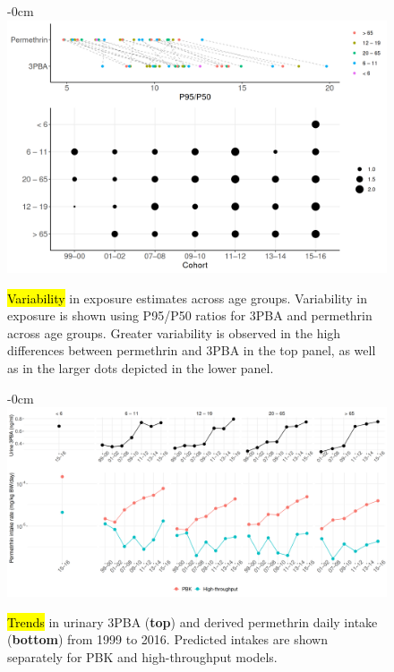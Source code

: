 \documentclass[toxics,article,accept,pdftex,moreauthors]{Definitions/mdpi}
\begin{document}
\begin{figure}[H]
\begin{adjustwidth}{-\extralength}{0cm}
~~~~~~~~~~~\includegraphics[width=0.9\linewidth,]{figures/fig5_variability} 
\end{adjustwidth}
\caption{\hl{Variability} %
 in exposure estimates across age groups. 
Variability in exposure is shown using P95/P50 ratios for 3PBA and permethrin across age groups. 
Greater variability is observed in the high differences between permethrin and 3PBA in the top panel, 
as well as in the larger dots depicted in the lower panel.}\label{fig:fig5}
\end{figure}

\vspace{-10pt}

\begin{figure}[H]
\begin{adjustwidth}{-\extralength}{0cm}
~~~~~~~~~~~\includegraphics[width=0.9\linewidth]{figures/fig6_trend}
\end{adjustwidth}
\caption{\hl{Trends} %
 in urinary 3PBA (\textbf{top}) and derived permethrin daily intake (\textbf{bottom}) from 1999
to 2016. Predicted intakes are shown separately for PBK and high-throughput models.\label{fig:fig6}}
\end{figure}
\end{document}
